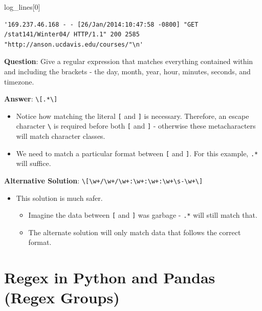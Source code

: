 \documentclass[
  letterpaper,
  DIV=11,
  numbers=noendperiod]{scrreprt}
\newenvironment{Shaded}{\begin{snugshade}}{\end{snugshade}}
\newcommand{\DecValTok}[1]{\textcolor[rgb]{0.68,0.00,0.00}{#1}}
\newcommand{\NormalTok}[1]{\textcolor[rgb]{0.00,0.23,0.31}{#1}}
\providecommand{\tightlist}{%
  \setlength{\itemsep}{0pt}\setlength{\parskip}{0pt}}\usepackage{longtable,booktabs,array}
\begin{document}
\begin{Shaded}
\begin{Highlighting}[]
\NormalTok{log\_lines[}\DecValTok{0}\NormalTok{]}
\end{Highlighting}
\end{Shaded}

\begin{verbatim}
'169.237.46.168 - - [26/Jan/2014:10:47:58 -0800] "GET /stat141/Winter04/ HTTP/1.1" 200 2585 "http://anson.ucdavis.edu/courses/"\n'
\end{verbatim}

\textbf{Question}: Give a regular expression that matches everything
contained within and including the brackets - the day, month, year,
hour, minutes, seconds, and timezone.

\textbf{Answer}: \texttt{\textbackslash{}{[}.*\textbackslash{}{]}}

\begin{itemize}
\tightlist
\item
  Notice how matching the literal \texttt{{[}} and \texttt{{]}} is
  necessary. Therefore, an escape character \texttt{\textbackslash{}} is
  required before both \texttt{{[}} and \texttt{{]}} - otherwise these
  metacharacters will match character classes.
\item
  We need to match a particular format between \texttt{{[}} and
  \texttt{{]}}. For this example, \texttt{.*} will suffice.
\end{itemize}

\textbf{Alternative Solution}:
\texttt{\textbackslash{}{[}\textbackslash{}w+/\textbackslash{}w+/\textbackslash{}w+:\textbackslash{}w+:\textbackslash{}w+:\textbackslash{}w+\textbackslash{}s-\textbackslash{}w+\textbackslash{}{]}}

\begin{itemize}
\tightlist
\item
  This solution is much safer.

  \begin{itemize}
  \tightlist
  \item
    Imagine the data between \texttt{{[}} and \texttt{{]}} was garbage -
    \texttt{.*} will still match that.
  \item
    The alternate solution will only match data that follows the correct
    format.
  \end{itemize}
\end{itemize}

\hypertarget{regex-in-python-and-pandas-regex-groups}{%
\section{Regex in Python and Pandas (Regex
Groups)}\label{regex-in-python-and-pandas-regex-groups}}
\end{document}
